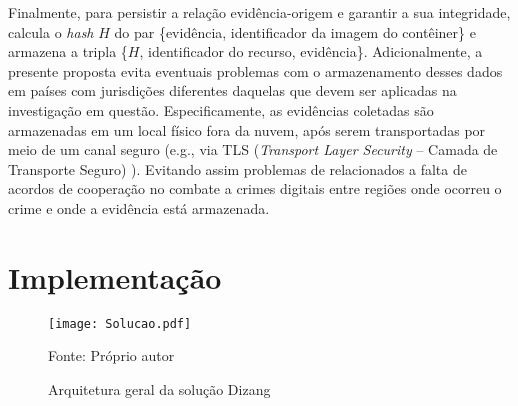 Finalmente, para persistir a relação evidência-origem e garantir a sua integridade, \fancyname calcula o \textit{hash} $H$ do par \{evidência, identificador da imagem do contêiner\} e armazena a tripla \{$H$, identificador do recurso, evidência\}.
%
Adicionalmente, a presente proposta evita eventuais problemas com o armazenamento desses dados em países com jurisdições diferentes daquelas que devem ser aplicadas na investigação em questão.
%
Especificamente, as evidências coletadas são armazenadas em um local físico fora da nuvem, após serem transportadas por meio de um canal seguro (e.g., via TLS (\textit{Transport Layer Security} -- Camada de Transporte Seguro) \cite{DierksT2008}).
%
Evitando assim problemas de relacionados a falta de acordos de cooperação no combate a crimes digitais entre regiões onde ocorreu o crime e onde a evidência está armazenada.

\section{Implementação}
\label{sec:proposta-impl}


\begin{figure}[htb!]
\footnotesize
\caption{Arquitetura geral da solução Dizang}
\texttt{[image: Solucao.pdf]}
\centering
\label{fig:Solucao}
\begin{center}
Fonte: Próprio autor 
\end{center}
\end{figure}

